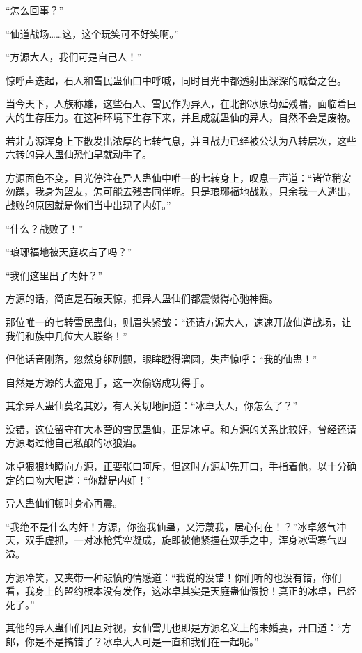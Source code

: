 
\begin{this_body}

“怎么回事？”

“仙道战场……这，这个玩笑可不好笑啊。”

“方源大人，我们可是自己人！”

惊呼声迭起，石人和雪民蛊仙口中呼喊，同时目光中都透射出深深的戒备之色。

当今天下，人族称雄，这些石人、雪民作为异人，在北部冰原苟延残喘，面临着巨大的生存压力。在这种环境下生存下来，并且成就蛊仙的异人，自然不会是废物。

若非方源浑身上下散发出浓厚的七转气息，并且战力已经被公认为八转层次，这些六转的异人蛊仙恐怕早就动手了。

方源面色不变，目光停注在异人蛊仙中唯一的七转身上，叹息一声道：“诸位稍安勿躁，我身为盟友，怎可能去残害同伴呢。只是琅琊福地战败，只余我一人逃出，战败的原因就是你们当中出现了内奸。”

“什么？战败了！”

“琅琊福地被天庭攻占了吗？”

“我们这里出了内奸？”

方源的话，简直是石破天惊，把异人蛊仙们都震慑得心驰神摇。

那位唯一的七转雪民蛊仙，则眉头紧皱：“还请方源大人，速速开放仙道战场，让我们和族中几位大人联络！”

但他话音刚落，忽然身躯剧颤，眼眸瞪得溜圆，失声惊呼：“我的仙蛊！”

自然是方源的大盗鬼手，这一次偷窃成功得手。

其余异人蛊仙莫名其妙，有人关切地问道：“冰卓大人，你怎么了？”

没错，这位留守在大本营的雪民蛊仙，正是冰卓。和方源的关系比较好，曾经还请方源喝过他自己私酿的冰狼酒。

冰卓狠狠地瞪向方源，正要张口呵斥，但这时方源却先开口，手指着他，以十分确定的口吻大喝道：“你就是内奸！”

异人蛊仙们顿时身心再震。

“我绝不是什么内奸！方源，你盗我仙蛊，又污蔑我，居心何在！？”冰卓怒气冲天，双手虚抓，一对冰枪凭空凝成，旋即被他紧握在双手之中，浑身冰雪寒气四溢。

方源冷笑，又夹带一种悲愤的情感道：“我说的没错！你们听的也没有错，你们看，我身上的盟约根本没有发作，这冰卓其实是天庭蛊仙假扮！真正的冰卓，已经死了。”

其他的异人蛊仙们相互对视，女仙雪儿也即是方源名义上的未婚妻，开口道：“方郎，你是不是搞错了？冰卓大人可是一直和我们在一起呢。”


\end{this_body}
